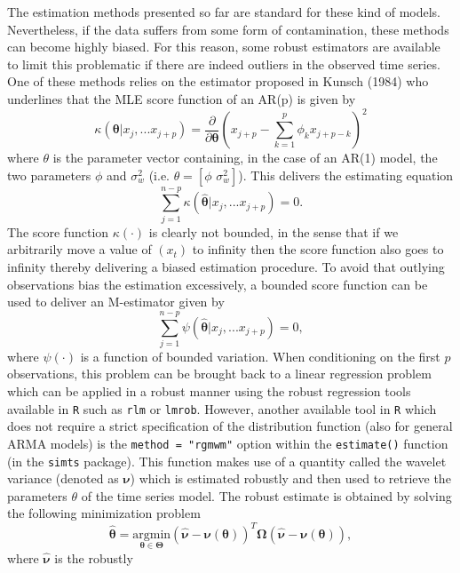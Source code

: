 \documentclass[]{book}
\theoremstyle{definition}
\theoremstyle{definition}
\theoremstyle{definition}
\theoremstyle{remark}
\begin{document}
The estimation methods presented so far are standard for these kind of
models. Nevertheless, if the data suffers from some form of
contamination, these methods can become highly biased. For this reason,
some robust estimators are available to limit this problematic if there
are indeed outliers in the observed time series. One of these methods
relies on the estimator proposed in Kunsch (1984) who underlines that
the MLE score function of an AR(p) is given by \begin{equation*}
 \kappa(\mathbf{\theta}|x_j,...x_{j+p}) = \frac{\partial}{\partial \mathbf{\theta}} (x_{j+p} - \sum_{k=1}^p \phi_k x_{j+p-k})^2
\end{equation*} where \(\theta\) is the parameter vector containing, in
the case of an AR(1) model, the two parameters \(\phi\) and
\(\sigma_w^2\) (i.e. \(\theta = [\phi \,\, \sigma_w^2]\)). This delivers
the estimating equation \begin{equation*}
\sum_{j=1}^{n-p} \kappa (\hat{\mathbf{\theta}}|x_j,...x_{j+p}) = 0 .
\end{equation*} The score function \(\kappa(\cdot)\) is clearly not
bounded, in the sense that if we arbitrarily move a value of \((x_t)\)
to infinity then the score function also goes to infinity thereby
delivering a biased estimation procedure. To avoid that outlying
observations bias the estimation excessively, a bounded score function
can be used to deliver an M-estimator given by \begin{equation*}
\sum_{j=1}^{n-p} \psi (\hat{\mathbf{\theta}}|x_j,...x_{j+p}) = 0,
\end{equation*} where \(\psi(\cdot)\) is a function of bounded
variation. When conditioning on the first \(p\) observations, this
problem can be brought back to a linear regression problem which can be
applied in a robust manner using the robust regression tools available
in \texttt{R} such as \texttt{rlm} or \texttt{lmrob}. However, another
available tool in \texttt{R} which does not require a strict
specification of the distribution function (also for general ARMA
models) is the \texttt{method\ =\ "rgmwm"} option within the
\texttt{estimate()} function (in the \texttt{simts} package). This
function makes use of a quantity called the wavelet variance (denoted as
\(\boldsymbol{\nu}\)) which is estimated robustly and then used to
retrieve the parameters \(\theta\) of the time series model. The robust
estimate is obtained by solving the following minimization problem
\begin{equation*}
\hat{\boldsymbol{\theta}} = \underset{\boldsymbol{\theta} \in \boldsymbol{\Theta}}{\text{argmin}} (\hat{\boldsymbol{\nu}} - \boldsymbol{\nu}(\boldsymbol{\theta}))^T\boldsymbol{\Omega}(\hat{\boldsymbol{\nu}} - \boldsymbol{\nu}({\boldsymbol{\theta}})),
\end{equation*} where \(\hat{\boldsymbol{\nu}}\) is the robustly
\end{document}
